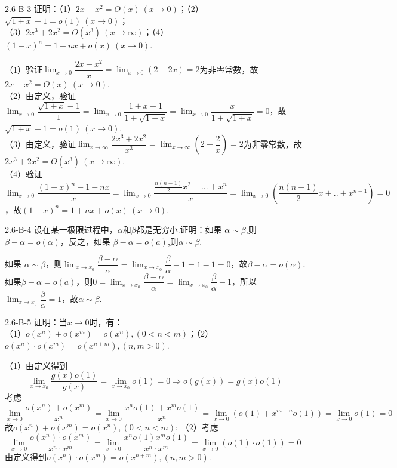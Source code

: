 \begin{example}{2.6-B-3}{}
    证明：（1）$2x-x^2=O(x)~(x\to 0)$；（2）$\sqrt{1+x}-1=o(1)~(x\to 0)$；\\
    （3）$2x^3+2x^2=O(x^3)~(x\to\infty)$；（4）$(1+x)^n=1+nx+o(x)~(x\to 0)$.
\end{example}
\begin{solution}
    （1）验证$\displaystyle \lim_{x\to 0}\dfrac{2x-x^2}{x}=\lim_{x\to 0}(2-2x)=2$为非零常数，故$2x-x^2=O(x)~(x\to 0)$.\\
    （2）由定义，验证$\displaystyle \lim_{x\to 0}\dfrac{\sqrt{1+x}-1}{1}=\lim_{x\to 0}\dfrac{1+x-1}{1+\sqrt{1+x}}=\lim_{x\to 0}\dfrac{x}{1+\sqrt{1+x}}=0$，故$\sqrt{1+x}-1=o(1)~(x\to 0)$.\\
    （3）由定义，验证$\displaystyle \lim_{x\to\infty}\dfrac{2x^3+2x^2}{x^3}=\lim_{x\to\infty}(2+\dfrac{2}{x})=2$为非零常数，故$2x^3+2x^2=O(x^3)~(x\to\infty)$.\\（4）验证$\displaystyle \lim_{x\to 0}\dfrac{(1+x)^n-1-nx}{x}=\lim_{x\to 0}\dfrac{\frac{n(n-1)}{2}x^2+...+x^n}{x}=\lim_{x\to 0}\left(\dfrac{n(n-1)}{2}x+..+x^{n-1}\right)=0$，故$(1+x)^n=1+nx+o(x)~(x\to 0)$.
\end{solution}
\begin{example}{2.6-B-4}{}
    设在某一极限过程中，$\alpha$和$\beta$都是无穷小.证明：如果 $\alpha\sim\beta$,则 $\beta-\alpha=o(\alpha)$，反之，如果 $\beta-\alpha=o(a)$,则$\alpha\sim\beta.$
\end{example}
\begin{solution}
    如果 $\alpha\sim\beta$，则$\displaystyle \lim_{x\to x_0}\dfrac{\beta-\alpha}{\alpha}=\lim_{x\to x_0}\dfrac{\beta}{\alpha}-1=1-1=0$，故$\beta-\alpha=o(\alpha)$.\\
    如果$\beta-\alpha=o(a)$，则$\displaystyle 0=\lim_{x\to x_0}\dfrac{\beta-\alpha}{\alpha}=\lim_{x\to x_0}\dfrac{\beta}{\alpha}-1$，所以$\lim_{x\to x_0}\dfrac{\beta}{\alpha}=1$，故$\alpha\sim\beta$.
\end{solution}
\begin{example}{2.6-B-5}{}
    证明：当$x\to 0$时，有：\\
    （1）$o(x^n)+o(x^m)=o(x^n),(0<n<m)$；（2）$o(x^n)\cdot o(x^m)=o(x^{n+m}),(n,m>0)$.
\end{example}
\begin{solution}
    （1）由定义得到\[\displaystyle\lim_{x\to x_0}\dfrac{g(x)o(1)}{g(x)}=\lim_{x\to x_0}o(1)=0\Rightarrow o(g(x))=g(x)o(1)\]考虑
    \[\displaystyle \lim_{x\to 0}\dfrac{o(x^n)+o(x^m)}{x^n}=\lim_{x\to 0}\dfrac{x^no(1)+x^mo(1)}{x^n}=\lim_{x\to 0}\left(o(1)+x^{m-n}o(1)\right)=\lim_{x\to 0}o(1)=0\]
    故$o(x^n)+o(x^m)=o(x^n),(0<n<m)$;
    （2）考虑
    \[\displaystyle \lim_{x\to 0}\dfrac{o(x^n)\cdot o(x^m)}{x^n\cdot x^m}=\lim_{x\to 0}\dfrac{x^no(1)x^mo(1)}{x^n\cdot x^m}=\lim_{x\to 0}\left(o(1)\cdot o(1)\right)=0\]
    由定义得到$o(x^n)\cdot o(x^m)=o(x^{n+m}),(n,m>0)$.
\end{solution}
